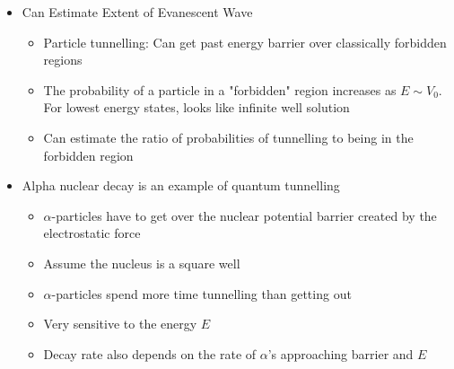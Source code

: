 \documentclass[12pt]{article}
\begin{document}
\begin{itemize}
    \item Can Estimate Extent of Evanescent Wave \begin{itemize}
        \item Particle tunnelling: Can get past energy barrier over classically forbidden regions
        \item The probability of a particle in a "forbidden" region increases as $E \sim V_0$. For lowest energy states, looks like infinite well solution
        \item Can estimate the ratio of probabilities of tunnelling to being in the forbidden region
    \end{itemize}
    \item Alpha nuclear decay is an example of quantum tunnelling \begin{itemize}
        \item $\alpha$-particles have to get over the nuclear potential barrier created by the electrostatic force
        \item Assume the nucleus is a square well
        \item $\alpha$-particles spend more time tunnelling than getting out
        \item Very sensitive to the energy $E$
        \item Decay rate also depends on the rate of $\alpha$'s approaching barrier and $E$
    \end{itemize}
\end{itemize}
\end{document}
